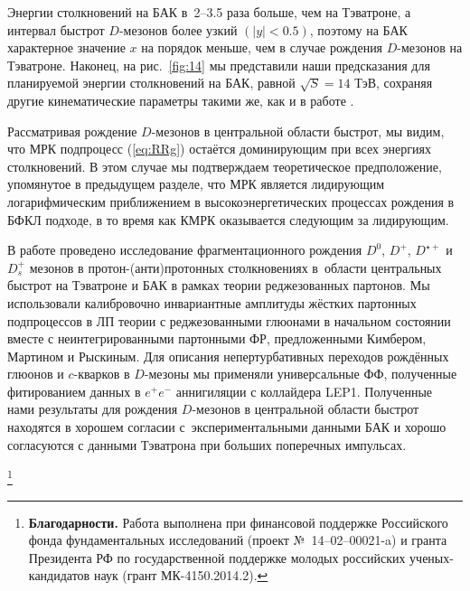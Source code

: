 Энергии столкновений на БАК в~2--3.5 раза больше, чем на Тэватроне, а интервал быстрот $D$-мезонов более узкий $(|y|<0.5)$, поэтому на БАК характерное значение $x$ на порядок меньше, чем в случае рождения $D$-мезонов на Тэватроне. Наконец, на рис.~\ref{fig:14} мы представили наши предсказания для планируемой энергии столкновений на БАК, равной $\sqrt S=14$ ТэВ, сохраняя другие кинематические параметры такими же, как и в работе \cite{ALICE7}.



Рассматривая рождение $D$-мезонов в центральной области быстрот, мы видим, что МРК подпроцесс (\ref{eq:RRg}) остаётся доминирующим при всех энергиях столкновений. В этом случае мы подтверждаем теоретическое предположение, упомянутое в предыдущем разделе, что МРК является лидирующим логарифмическим приближением в высокоэнергетических процессах рождения в БФКЛ подходе, в то время как КМРК оказывается следующим за лидирующим.



\smallskip




В работе проведено исследование фрагментационного рождения $D^0$, $D^+$, $D^{\star+}$ и $D_s^+$ мезонов в протон-(анти)протонных столкновениях в~области центральных быстрот на Тэватроне и БАК в рамках теории реджезованных партонов. Мы использовали калибровочно инвариантные амплитуды жёстких партонных подпроцессов в ЛП теории с реджезованными глюонами в начальном состоянии вместе с неинтегрированными партонными ФР, предложенными Кимбером, Мартином и Рыскиным. Для описания непертурбативных переходов рождённых глюонов и $c$-кварков в $D$-мезоны мы применяли универсальные ФФ, полученные фитированием данных в ${e^+e^-}$ аннигиляции с коллайдера LEP1. Полученные нами результаты для рождения $D$-мезонов в центральной области быстрот находятся в хорошем согласии с~экспериментальными данными БАК и хорошо согласуются с данными Тэватрона при больших поперечных импульсах.



\thanks{\textbf{Благодарности.} Работа выполнена при финансовой поддержке Российского фонда фундаментальных исследований (проект №~14--02--00021-a) и гранта Президента РФ  по государственной поддержке молодых российских ученых-кандидатов наук (грант МК-4150.2014.2).}





